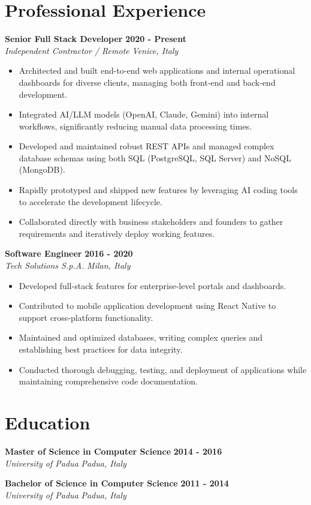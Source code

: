 \documentclass[10pt,a4paper]{article}
\begin{document}
\section*{Professional Experience}
\textbf{Senior Full Stack Developer} \hfill \textbf{2020 - Present} \\
\textit{Independent Contractor / Remote} \hfill \textit{Venice, Italy}
\begin{itemize}
    \item Architected and built end-to-end web applications and internal operational dashboards for diverse clients, managing both front-end and back-end development.
    \item Integrated AI/LLM models (OpenAI, Claude, Gemini) into internal workflows, significantly reducing manual data processing times.
    \item Developed and maintained robust REST APIs and managed complex database schemas using both SQL (PostgreSQL, SQL Server) and NoSQL (MongoDB).
    \item Rapidly prototyped and shipped new features by leveraging AI coding tools to accelerate the development lifecycle.
    \item Collaborated directly with business stakeholders and founders to gather requirements and iteratively deploy working features.
\end{itemize}

\textbf{Software Engineer} \hfill \textbf{2016 - 2020} \\
\textit{Tech Solutions S.p.A.} \hfill \textit{Milan, Italy}
\begin{itemize}
    \item Developed full-stack features for enterprise-level portals and dashboards.
    \item Contributed to mobile application development using React Native to support cross-platform functionality.
    \item Maintained and optimized databases, writing complex queries and establishing best practices for data integrity.
    \item Conducted thorough debugging, testing, and deployment of applications while maintaining comprehensive code documentation.
\end{itemize}

\section*{Education}
\textbf{Master of Science in Computer Science} \hfill \textbf{2014 - 2016} \\
\textit{University of Padua} \hfill \textit{Padua, Italy}

\textbf{Bachelor of Science in Computer Science} \hfill \textbf{2011 - 2014} \\
\textit{University of Padua} \hfill \textit{Padua, Italy}
\end{document}
